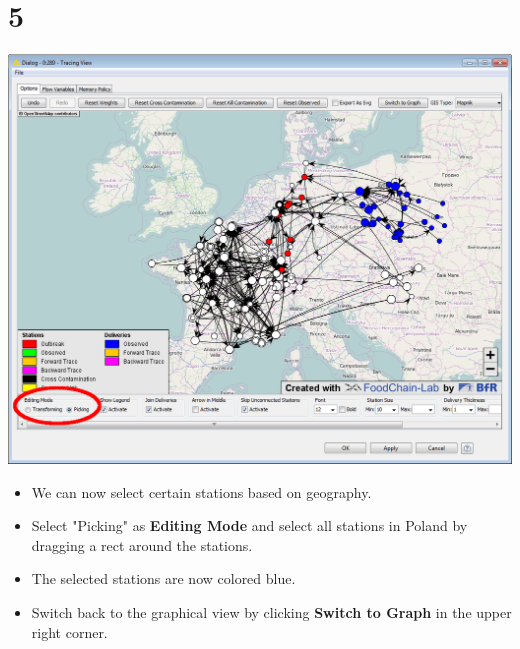 \documentclass{beamer}
\begin{document}
\section{5}
\begin{frame}
	\begin{center}
  		\includegraphics[height=0.6\textheight]{5.png}
	\end{center}
	\begin{itemize}
		\item We can now select certain stations based on geography.
		\item Select "Picking" as \textbf{Editing Mode} and select all stations in Poland by dragging a rect around the stations.
		\item The selected stations are now colored blue.
		\item Switch back to the graphical view by clicking \textbf{Switch to Graph} in the upper right corner.
	\end{itemize}
\end{frame}
\end{document}

